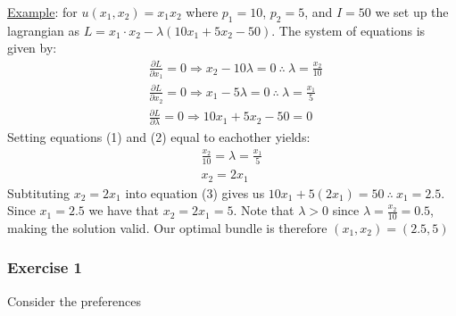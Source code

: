 \documentclass{article}
\begin{document}
  \par
  \underline{Example}: for $u(x_{1},x_{2}) = x_{1}x_{2}$ where $p_{1} = 10$, $p_{2} = 5$, and $I = 50$ we set up the lagrangian as $L = x_{1}\cdot x_{2} - \lambda(10x_{1} + 5x_{2} - 50)$. The system of equations is given by:
  \begin{align*}
    &\frac{\partial L}{\partial x_{1}} = 0 \Rightarrow x_{2} - 10\lambda = 0 \ \therefore \ \lambda = \frac{x_{2}}{10} \ \tag{1} \\
    &\frac{\partial L}{\partial x_{2}} = 0 \Rightarrow x_{1} - 5\lambda = 0 \ \therefore \ \lambda = \frac{x_{1}}{5} \ \tag{2} \\
    &\frac{\partial L}{\partial \lambda} = 0 \Rightarrow 10x_{1} + 5x_{2} - 50 = 0 \ \tag{3}
  \end{align*}
  Setting equations (1) and (2) equal to eachother yields:
  \begin{gather*}
    \frac{x_{2}}{10} = \lambda = \frac{x_{1}}{5} \\
    x_{2} = 2x_{1}
  \end{gather*}
  Subtituting $x_{2} = 2x_{1}$ into equation (3) gives us $10x_{1} + 5(2x_{1}) = 50 \ \therefore \ x_{1} = 2.5$. Since $x_{1} = 2.5$ we have that $x_{2} = 2x_{1} = 5$. Note that $\lambda > 0$ since $\lambda = \tfrac{x_{2}}{10} = 0.5$, making the solution valid. Our optimal bundle is therefore $(x_{1}, x_{2}) = (2.5, 5)$
  \par
\vspace{6mm}
\subsubsection{Exercise 1}
Consider the preferences \par \vspace{0.3em}
\end{document}
